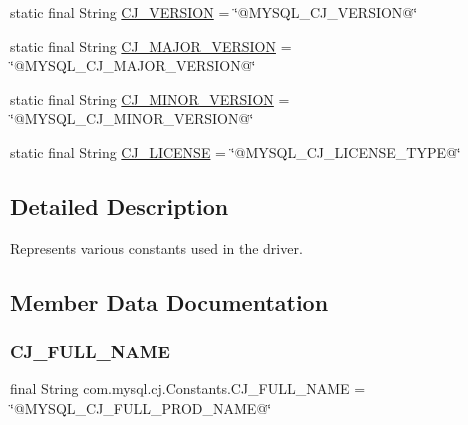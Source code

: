 \begin{DoxyCompactItemize}
\item 
static final String \mbox{\hyperlink{classcom_1_1mysql_1_1cj_1_1_constants_a424c01aee825cf22fefff13a8f9ce294}{C\+J\+\_\+\+V\+E\+R\+S\+I\+ON}} = \char`\"{}@M\+Y\+S\+Q\+L\+\_\+\+C\+J\+\_\+\+V\+E\+R\+S\+I\+ON@\char`\"{}
\item 
static final String \mbox{\hyperlink{classcom_1_1mysql_1_1cj_1_1_constants_abf0a3841d1e94bbed47436e7e62b9c0d}{C\+J\+\_\+\+M\+A\+J\+O\+R\+\_\+\+V\+E\+R\+S\+I\+ON}} = \char`\"{}@M\+Y\+S\+Q\+L\+\_\+\+C\+J\+\_\+\+M\+A\+J\+O\+R\+\_\+\+V\+E\+R\+S\+I\+ON@\char`\"{}
\item 
static final String \mbox{\hyperlink{classcom_1_1mysql_1_1cj_1_1_constants_ab41d1729b84c021713359e3026b7958a}{C\+J\+\_\+\+M\+I\+N\+O\+R\+\_\+\+V\+E\+R\+S\+I\+ON}} = \char`\"{}@M\+Y\+S\+Q\+L\+\_\+\+C\+J\+\_\+\+M\+I\+N\+O\+R\+\_\+\+V\+E\+R\+S\+I\+ON@\char`\"{}
\item 
static final String \mbox{\hyperlink{classcom_1_1mysql_1_1cj_1_1_constants_ada028846df5654105fdaf3ec2a385476}{C\+J\+\_\+\+L\+I\+C\+E\+N\+SE}} = \char`\"{}@M\+Y\+S\+Q\+L\+\_\+\+C\+J\+\_\+\+L\+I\+C\+E\+N\+S\+E\+\_\+\+T\+Y\+PE@\char`\"{}
\end{DoxyCompactItemize}


\subsection{Detailed Description}
Represents various constants used in the driver. 

\subsection{Member Data Documentation}
\mbox{\label{classcom_1_1mysql_1_1cj_1_1_constants_aaa6a79904f228b32972bf84513000f5e}} 
\subsubsection{\texorpdfstring{C\+J\+\_\+\+F\+U\+L\+L\+\_\+\+N\+A\+ME}{CJ\_FULL\_NAME}}
{\footnotesize\ttfamily final String com.\+mysql.\+cj.\+Constants.\+C\+J\+\_\+\+F\+U\+L\+L\+\_\+\+N\+A\+ME = \char`\"{}@M\+Y\+S\+Q\+L\+\_\+\+C\+J\+\_\+\+F\+U\+L\+L\+\_\+\+P\+R\+O\+D\+\_\+\+N\+A\+ME@\char`\"{}\hspace{0.3cm}{\ttfamily [static]}}

